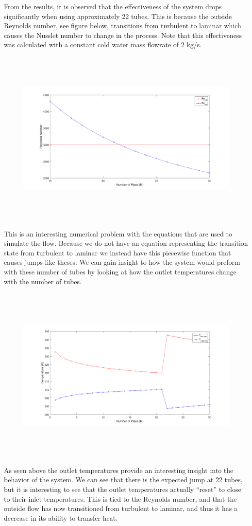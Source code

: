 %
\noindent
From the results, it is observed that the effectiveness of the system drops significantly when using approximately 22 tubes. This is because the outside Reynolds number, see figure below, transitions from turbulent to laminar which causes the Nusslet number to change in the process. Note that this effectiveness was calculated with a constant cold water mass flowrate of 2 kg/s.
%
\begin{figure}[H]
    \centering
    \includegraphics[height=3.5in]{pictures/part_2_2m2_reynolds_crit.png}
\end{figure}
%
\noindent
This is an interesting numerical problem with the equations that are used to simulate the flow. Because we do not have an equation representing the transition state from turbulent to laminar we instead have this piecewise function that causes jumps like theses. We can gain insight to how the system would preform with these number of tubes by looking at how the outlet temperatures change with the number of tubes.
%
\begin{figure}[H]
    \centering
    \includegraphics[height=3.5in]{pictures/part_2_2m2_temps.png}
\end{figure}
%
\noindent
As seen above the outlet temperatures provide an interesting insight into the behavior of the system. We can see that there is the expected jump at 22 tubes, but it is interesting to see that the outlet temperatures actually ``reset'' to close to their inlet temperatures. This is tied to the Reynolds number, and that the outside flow has now transitioned from turbulent to laminar, and thus it has a decrease in its ability to transfer heat.